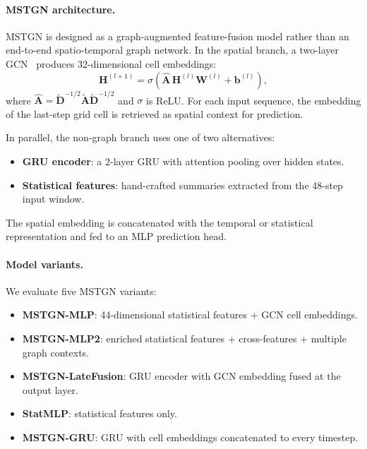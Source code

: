 \documentclass[conference]{IEEEtran}
\begin{document}
\paragraph{MSTGN architecture.}
MSTGN is designed as a graph-augmented feature-fusion model rather than an end-to-end spatio-temporal graph network. In the spatial branch, a two-layer GCN~\cite{kipf2017gcn} produces 32-dimensional cell embeddings:
\begin{equation}
    \mathbf{H}^{(l+1)} = \sigma\!\left(\hat{\mathbf{A}} \, \mathbf{H}^{(l)} \mathbf{W}^{(l)} + \mathbf{b}^{(l)}\right),
\end{equation}
where $\hat{\mathbf{A}} = \tilde{\mathbf{D}}^{-1/2}\tilde{\mathbf{A}}\tilde{\mathbf{D}}^{-1/2}$ and $\sigma$ is ReLU. For each input sequence, the embedding of the last-step grid cell is retrieved as spatial context for prediction.

In parallel, the non-graph branch uses one of two alternatives:
\begin{itemize}
    \item \textbf{GRU encoder}: a 2-layer GRU with attention pooling over hidden states.
    \item \textbf{Statistical features}: hand-crafted summaries extracted from the 48-step input window.
\end{itemize}
The spatial embedding is concatenated with the temporal or statistical representation and fed to an MLP prediction head.

\paragraph{Model variants.}
We evaluate five MSTGN variants:
\begin{itemize}
    \item \textbf{MSTGN-MLP}: 44-dimensional statistical features + GCN cell embeddings.
    \item \textbf{MSTGN-MLP2}: enriched statistical features + cross-features + multiple graph contexts.
    \item \textbf{MSTGN-LateFusion}: GRU encoder with GCN embedding fused at the output layer.
    \item \textbf{StatMLP}: statistical features only.
    \item \textbf{MSTGN-GRU}: GRU with cell embeddings concatenated to every timestep.
\end{itemize}
\end{document}
